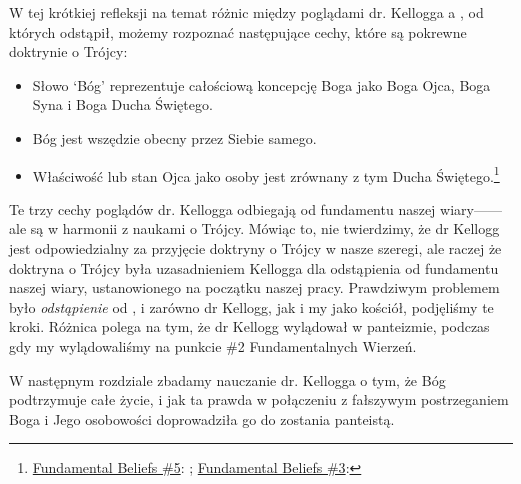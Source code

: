 W tej krótkiej refleksji na temat różnic między poglądami dr. Kellogga a , od których odstąpił, możemy rozpoznać następujące cechy, które są pokrewne doktrynie o Trójcy:

\begin{itemize}
    \item Słowo ‘Bóg’ reprezentuje całościową koncepcję Boga jako Boga Ojca, Boga Syna i Boga Ducha Świętego.
    \item Bóg jest wszędzie obecny przez Siebie samego.
    \item Właściwość lub stan Ojca jako osoby jest zrównany z tym Ducha Świętego.\footnote{\href{https://www.adventist.org/wp-content/uploads/2020/06/ADV-28Beliefs2020.pdf}{Fundamental Beliefs \#5}: ; \href{https://www.adventist.org/wp-content/uploads/2020/06/ADV-28Beliefs2020.pdf}{Fundamental Beliefs \#3}: }
\end{itemize}

Te trzy cechy poglądów dr. Kellogga odbiegają od fundamentu naszej wiary——ale są w harmonii z naukami o Trójcy. Mówiąc to, nie twierdzimy, że dr Kellogg jest odpowiedzialny za przyjęcie doktryny o Trójcy w nasze szeregi, ale raczej że doktryna o Trójcy była uzasadnieniem Kellogga dla odstąpienia od fundamentu naszej wiary, ustanowionego na początku naszej pracy. Prawdziwym problemem było \textit{odstąpienie} od , i zarówno dr Kellogg, jak i my jako kościół, podjęliśmy te kroki. Różnica polega na tym, że dr Kellogg wylądował w panteizmie, podczas gdy my wylądowaliśmy na punkcie \#2 Fundamentalnych Wierzeń.

W następnym rozdziale zbadamy nauczanie dr. Kellogga o tym, że Bóg podtrzymuje całe życie, i jak ta prawda w połączeniu z fałszywym postrzeganiem Boga i Jego osobowości doprowadziła go do zostania panteistą.


